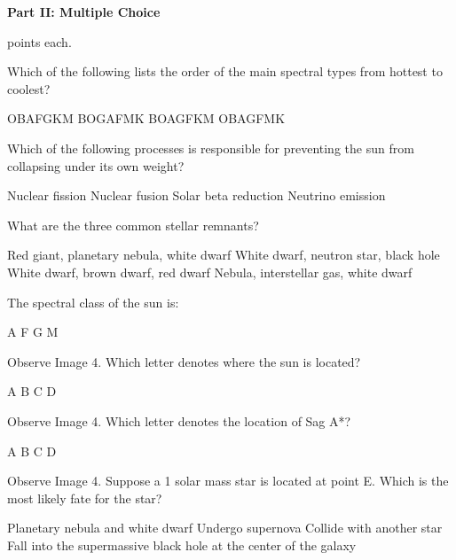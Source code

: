 \documentclass{exam}
\begin{document}
\newpage
\par\noindent \textbf{\large  Part II: Multiple Choice}
	\par{} points each.
\setlength{\columnsep}{0.40 in}
\begin{multicols*}{2}
\renewcommand{\choiceshook}{\setlength{\leftmargin}{0.40 in}}
\renewcommand{\questionshook}{\setlength{\leftmargin}{0.0 in}}
\begin{questions}
\setcounter{question}{15}
	\question Which of the following lists the order of the main spectral types from hottest to coolest?
	\begin{choices}
		\CorrectChoice OBAFGKM
		\choice BOGAFMK
		\choice BOAGFKM
		\choice OBAGFMK
	\end{choices}
	\question Which of the following processes is responsible for preventing the sun from collapsing under its own weight?
	\begin{choices}
		\choice Nuclear fission
		\CorrectChoice Nuclear fusion
		\choice Solar beta reduction
		\choice Neutrino emission
	\end{choices}
	\question What are the three common stellar remnants?
	\begin{choices}
		\choice Red giant, planetary nebula, white dwarf
		\CorrectChoice White dwarf, neutron star, black hole
		\choice White dwarf, brown dwarf, red dwarf
		\choice Nebula, interstellar gas, white dwarf
	\end{choices}
	\question The spectral class of the sun is:
	\begin{choices}
		\choice A
		\choice F
		\CorrectChoice G
		\choice M
	\end{choices}
	\question Observe Image 4. Which letter denotes where the sun is located?
	\begin{choices}
		\choice A
		\CorrectChoice B
		\choice C
		\choice D
	\end{choices}
	\question Observe Image 4. Which letter denotes the location of Sag A*?
	\begin{choices}
		\choice A
		\choice B
		\CorrectChoice C
		\choice D
	\end{choices}
	\vfill\null\columnbreak
	\question Observe Image 4. Suppose a 1 solar mass star is located at point E. Which is the most likely fate for the star?
	\begin{choices}
		\CorrectChoice Planetary nebula and white dwarf
		\choice Undergo supernova
		\choice Collide with another star
		\choice Fall into the supermassive black hole at the center of the galaxy
	\end{choices}

\end{questions}
\end{multicols*}
\end{document}
